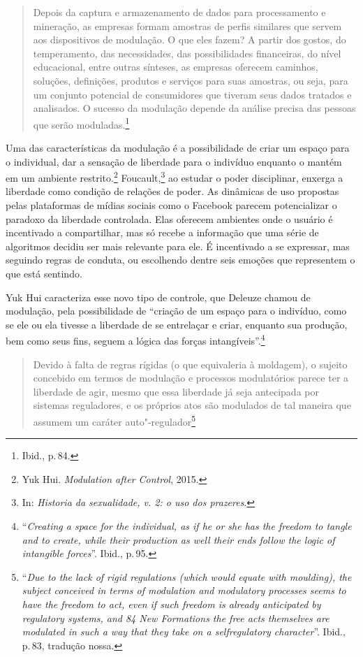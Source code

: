\begin{quote}
Depois da captura e armazenamento de dados para processamento e
mineração, as empresas formam amostras de perfis similares que servem
aos dispositivos de modulação. O que eles fazem? A partir dos gostos, do
temperamento, das necessidades, das possibilidades financeiras, do nível
educacional, entre outras sínteses, as empresas oferecem caminhos,
soluções, definições, produtos e serviços para suas amostras, ou seja,
para um conjunto potencial de consumidores que tiveram seus dados
tratados e analisados. O sucesso da modulação depende da análise precisa
das pessoas que serão moduladas.\footnote{Ibid., p.\,84.}
\end{quote}

Uma das características da modulação é a possibilidade de criar um
espaço para o individual, dar a sensação de liberdade para o indivíduo
enquanto o mantém em um ambiente restrito.\footnote{Yuk Hui. \emph{Modulation after Control}, 2015.}
Foucault,\footnote{In: \emph{Historia da sexualidade, v. 2: o uso dos prazeres}.} ao estudar o poder disciplinar, enxerga a liberdade como condição de
relações de poder. As dinâmicas de uso propostas pelas plataformas de
mídias sociais como o Facebook parecem potencializar o paradoxo da
liberdade controlada. Elas oferecem ambientes onde o usuário é
incentivado a compartilhar, mas só recebe a informação que uma série de
algoritmos decidiu ser mais relevante para ele. É incentivado a se
expressar, mas seguindo regras de conduta, ou escolhendo dentre seis
emoções que representem o que está sentindo.

Yuk Hui caracteriza esse novo tipo de controle, que Deleuze
chamou de modulação, pela possibilidade de ``criação de um espaço
para o indivíduo, como se ele ou ela tivesse a liberdade de se
entrelaçar e criar, enquanto sua produção, bem como seus fins, seguem a
lógica das forças intangíveis''.\footnote{``\emph{Creating a space for the
  individual, as if he or she has the freedom to tangle and to create,
  while their production as well their ends follow the logic of
  intangible forces}''. Ibid., p.\,95.}

\begin{quote}
Devido à falta de regras rígidas (o que equivaleria à moldagem), o
sujeito concebido em termos de modulação e processos modulatórios parece
ter a liberdade de agir, mesmo que essa liberdade já seja antecipada por
sistemas reguladores, e os próprios atos são modulados de tal maneira
que assumem um caráter auto"-regulador\footnote{``\emph{Due to the lack of
  rigid regulations (which would equate with moulding), the subject
  conceived in terms of modulation and modulatory processes seems to
  have the freedom to act, even if such freedom is already anticipated
  by regulatory systems, and 84 New Formations the free acts themselves
  are modulated in such a way that they take on a selfregulatory
  character}''. Ibid., p.\,83, tradução nossa.}
\end{quote}

